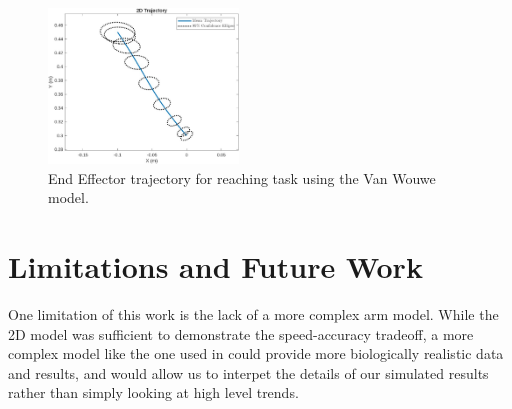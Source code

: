 \documentclass[letterpaper, 10pt, conference]{ieeeconf}
\begin{document}
\begin{figure}[h]
    \centering
    \includegraphics[width=0.45\textwidth]{images/demo_traj_small.jpg}
    \caption{End Effector trajectory for reaching task using the Van Wouwe model.}
    \label{fig:demo_position}
\end{figure}

\section{Limitations and Future Work}

One limitation of this work is the lack of a more complex arm model. While the 2D model was sufficient to demonstrate the speed-accuracy tradeoff, a more complex model like the one used in \cite{original_paper_high_fidelity} could provide more biologically realistic data and results, and would allow us to interpet the details of our simulated results rather than simply looking at high level trends.
\end{document}
